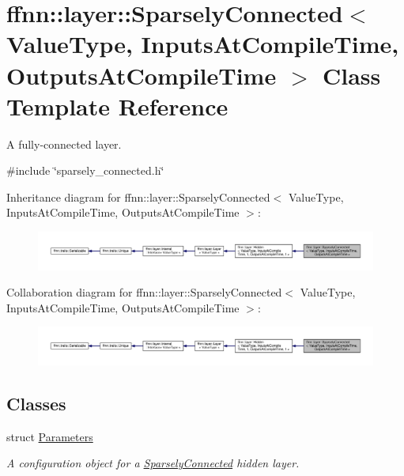 \hypertarget{classffnn_1_1layer_1_1_sparsely_connected}{\section{ffnn\-:\-:layer\-:\-:Sparsely\-Connected$<$ Value\-Type, Inputs\-At\-Compile\-Time, Outputs\-At\-Compile\-Time $>$ Class Template Reference}
\label{classffnn_1_1layer_1_1_sparsely_connected}
}


A fully-\/connected layer.  




{\ttfamily \#include \char`\"{}sparsely\-\_\-connected.\-h\char`\"{}}



Inheritance diagram for ffnn\-:\-:layer\-:\-:Sparsely\-Connected$<$ Value\-Type, Inputs\-At\-Compile\-Time, Outputs\-At\-Compile\-Time $>$\-:\nopagebreak
\begin{figure}[H]
\begin{center}
\leavevmode
\includegraphics[width=350pt]{classffnn_1_1layer_1_1_sparsely_connected__inherit__graph}
\end{center}
\end{figure}


Collaboration diagram for ffnn\-:\-:layer\-:\-:Sparsely\-Connected$<$ Value\-Type, Inputs\-At\-Compile\-Time, Outputs\-At\-Compile\-Time $>$\-:
\nopagebreak
\begin{figure}[H]
\begin{center}
\leavevmode
\includegraphics[width=350pt]{classffnn_1_1layer_1_1_sparsely_connected__coll__graph}
\end{center}
\end{figure}
\subsection*{Classes}
\begin{DoxyCompactItemize}
\item 
struct \hyperlink{structffnn_1_1layer_1_1_sparsely_connected_1_1_parameters}{Parameters}
\begin{DoxyCompactList}\small\item\em A configuration object for a \hyperlink{classffnn_1_1layer_1_1_sparsely_connected}{Sparsely\-Connected} hidden layer. \end{DoxyCompactList}\end{DoxyCompactItemize}
